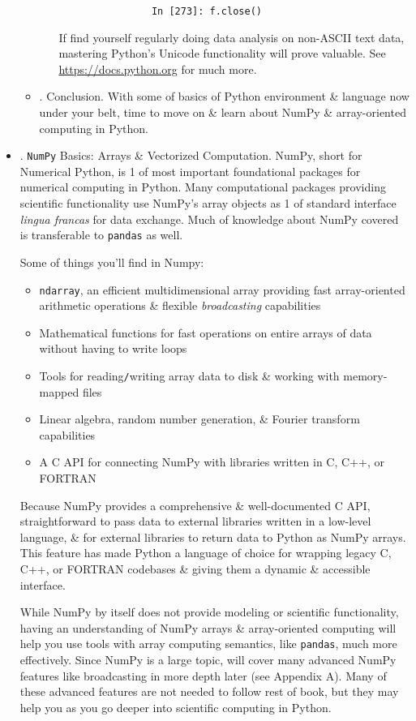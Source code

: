 \documentclass{article}
\begin{document}
\begin{itemize}
\begin{itemize}
\begin{itemize}
\begin{verbatim}
				In [273]: f.close()
			\end{verbatim}
			If find yourself regularly doing data analysis on non-ASCII text data, mastering Python's Unicode functionality will prove valuable. See \url{https://docs.python.org} for much more.
		\end{itemize}
		\item {. Conclusion.} With some of basics of Python environment \& language now under your belt, time to move on \& learn about NumPy \& array-oriented computing in Python.
	\end{itemize}
	\item {. {\tt NumPy} Basics: Arrays \& Vectorized Computation.} NumPy, short for Numerical Python, is 1 of most important foundational packages for numerical computing in Python. Many computational packages providing scientific functionality use NumPy's array objects as 1 of standard interface {\it lingua francas} for data exchange. Much of knowledge about NumPy covered is transferable to {\tt pandas} as well.
	
	Some of things you'll find in Numpy:
	\begin{itemize}
		\item {\tt ndarray}, an efficient multidimensional array providing fast array-oriented arithmetic operations \& flexible {\it broadcasting} capabilities
		\item Mathematical functions for fast operations on entire arrays of data without having to write loops
		\item Tools for reading{\tt/}writing array data to disk \& working with memory-mapped files
		\item Linear algebra, random number generation, \& Fourier transform capabilities
		\item A C API for connecting NumPy with libraries written in C, C++, or FORTRAN
	\end{itemize}
	Because NumPy provides a comprehensive \& well-documented C API, straightforward to pass data to external libraries written in a low-level language, \& for external libraries to return data to Python as NumPy arrays. This feature has made Python a language of choice for wrapping legacy C, C++, or FORTRAN codebases \& giving them a dynamic \& accessible interface.
	
	While NumPy by itself does not provide modeling or scientific functionality, having an understanding of NumPy arrays \& array-oriented computing will help you use tools with array computing semantics, like {\tt pandas}, much more effectively. Since NumPy is a large topic, will cover many advanced NumPy features like broadcasting in more depth later (see Appendix A). Many of these advanced features are not needed to follow rest of book, but they may help you as you go deeper into scientific computing in Python.
	

\end{itemize}
\end{document}

